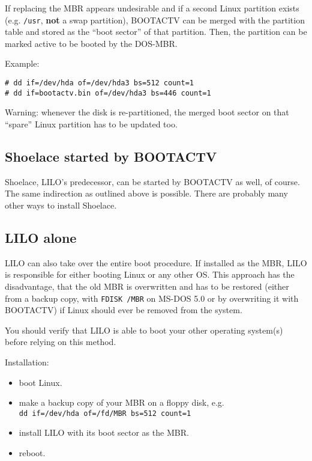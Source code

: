 If replacing the MBR appears undesirable and if a second Linux partition
exists (e.g. {\tt /usr}, {\bf not} a swap partition), BOOTACTV can be merged
with
the partition table and stored as the ``boot sector'' of that partition.
Then, the partition can be marked active to be booted by the DOS-MBR.

Example:
\begin{verbatim}
# dd if=/dev/hda of=/dev/hda3 bs=512 count=1
# dd if=bootactv.bin of=/dev/hda3 bs=446 count=1
\end{verbatim}

Warning: whenever the disk is re-partitioned, the merged boot sector on that
``spare'' Linux partition has to be updated too.


\subsection{Shoelace started by BOOTACTV}


Shoelace, LILO's predecessor, can be started by BOOTACTV as well, of course.
The same indirection as outlined above is possible. There are probably many
other ways to install Shoelace.


\subsection{LILO alone}


LILO can also take over the entire boot procedure. If installed as the MBR,
LILO is responsible for either booting Linux or any other OS. This approach
has the disadvantage, that the old MBR is overwritten and has to be restored
(either from a backup copy, with \verb"FDISK /MBR" on MS-DOS 5.0 or by
overwriting
it with BOOTACTV) if Linux should ever be removed from the system.

You should verify that LILO is able to boot your other operating system(s)
before relying on this method.

Installation:
\begin{itemize}
  \item boot Linux.
  \item make a backup copy of your MBR on a floppy disk, e.g. \\
    \verb"dd if=/dev/hda of=/fd/MBR bs=512 count=1"
  \item install LILO with its boot sector as the MBR.
  \item reboot.
\end{itemize}

